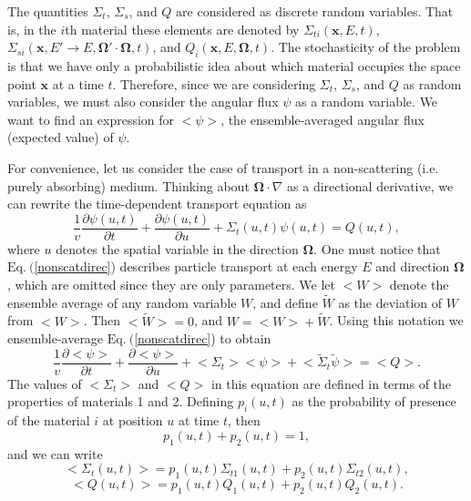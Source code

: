 \documentclass[12pt]{article}
\newcommand{\bl}{\big<}
\newcommand{\bg}{\big>}
\newcommand{\n}{ \noindent}
\begin{document}
The quantities $\Sigma_t$, $\Sigma_s$, and $Q$ are considered as discrete random variables.
That is, in the $i$th material these elements are denoted by $\Sigma_{ti}(\bm x,E,t)$, $\Sigma_{si}(\bm x,E'\rightarrow E,\bm\Omega'\cdot\bm\Omega,t)$, and $Q_i(\bm x,E,\bm\Omega,t)$.
The stochasticity of the problem is that we have only a probabilistic idea about which material occupies the space point $\bm x$ at a time $t$.
Therefore, since we are considering $\Sigma_t$, $\Sigma_s$, and $Q$ as random variables, we must also consider the angular flux $\psi$ as a random variable.
We want to find an expression for $\bl\psi\bg$, the ensemble-averaged angular flux (expected value) of $\psi$.

For convenience, let us consider the case of transport in a non-scattering (i.e. purely absorbing) medium.
Thinking about $\bm\Omega\cdot\nabla$ as a directional derivative, we can rewrite the time-dependent transport equation as
\begin{equation}\label{nonscatdirec}
\frac{1}{v}\frac{\partial\psi(u,t)}{\partial t}+\frac{\partial\psi(u,t)}{\partial u}+
\Sigma_t(u,t)\psi(u,t)=Q(u,t),
\end{equation}
\n where $u$ denotes the spatial variable in the direction $\bm\Omega$.
One must notice that $\textrm{Eq.}\ ($\ref{nonscatdirec}) describes particle transport at each energy $E$ and direction $\bm\Omega$, which are omitted since they are only parameters.
We let $\bl W \bg$ denote the ensemble average of any random variable $W$, and define $\tilde W$ as the deviation of $W$ from $\bl W \bg$.
Then $\bl \tilde W \bg = 0$, and $W = \bl W\bg + \tilde W$.
Using this notation we ensemble-average $\textrm{Eq.}\ ($\ref{nonscatdirec}) to obtain
\begin{equation}\label{nonscataverage}
\frac{1}{v}\frac{\partial\bl\psi\bg}{\partial t}+\frac{\partial\bl\psi\bg}{\partial u}+
\bl\Sigma_t\bg\bl\psi\bg + \bl \tilde \Sigma_t \tilde \psi\bg = \bl Q\bg.
\end{equation}
The values of $\bl\Sigma_t\bg$ and $\bl Q\bg$ in this equation are defined in terms of the properties of materials 1 and 2.
Defining $p_i(u,t)$ as the probability of presence of the material $i$ at position $u$ at time $t$, then 
\begin{equation}
p_1(u,t)+p_2(u,t) = 1,
\end{equation}
\n and we can write 
\begin{equation}
\bl \Sigma_t(u,t)\bg = p_1(u,t)\Sigma_{t1}(u,t)+p_2(u,t)\Sigma_{t2}(u,t),
\end{equation}
\begin{equation}
\bl Q(u,t)\bg = p_1(u,t)Q_1(u,t)+p_2(u,t)Q_2(u,t).
\end{equation}
\end{document}
